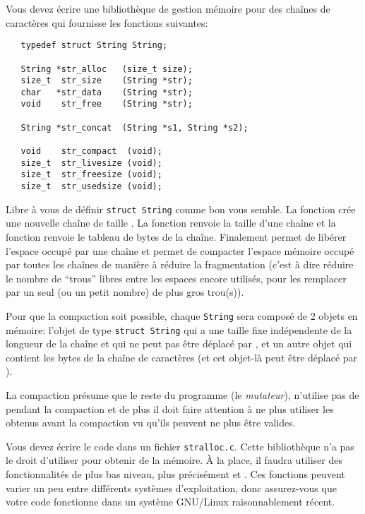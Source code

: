 \documentclass{article}
\begin{document}
Vous devez écrire une bibliothèque de gestion mémoire pour des
chaînes de caractères qui fournisse les fonctions suivantes:
\begin{verbatim}
   typedef struct String String;

   String *str_alloc   (size_t size);
   size_t  str_size    (String *str);
   char   *str_data    (String *str);
   void    str_free    (String *str);

   String *str_concat  (String *s1, String *s2);

   void    str_compact  (void);
   size_t  str_livesize (void);
   size_t  str_freesize (void);
   size_t  str_usedsize (void);
\end{verbatim}
Libre à vous de définir \texttt{struct String} comme bon vous semble.
La fonction  crée une nouvelle chaîne de taille .
La fonction  renvoie la taille d'une chaîne et la fonction
 renvoie le tableau de bytes de la chaîne.
Finalement  permet de libérer l'espace occupé par une chaîne
et  permet de compacter l'espace mémoire occupé par toutes
les chaînes de manière à réduire la fragmentation (c'est à dire réduire le
nombre de ``trous'' libres entre les espaces encore utilisés, pour les
remplacer par un seul (ou un petit nombre) de plus gros trou(s)).

Pour que la compaction soit possible, chaque \texttt{String} sera composé de
2 objets en mémoire: l'objet de type \texttt{struct String} qui a une taille
fixe indépendente de la longueur de la chaîne et qui ne peut pas être
déplacé par , et un autre objet qui contient les bytes de
la chaîne de caractères (et cet objet-là peut être déplacé par
).

La compaction présume que le reste du programme (le \emph{mutateur}),
n'utilise pas de  pendant la compaction et de plus il doit
faire attention à ne plus utiliser les  obtenus avant la
compaction vu qu'ils peuvent ne plus être valides.

Vous devez écrire le code dans un fichier \texttt{stralloc.c}.
Cette bibliothèque n'a pas le droit d'utiliser  pour obtenir de la
mémoire.  À la place, il faudra utiliser des fonctionnalités de plus bas
niveau, plus précisément  et .  Ces fonctions peuvent
varier un peu entre différents systèmes d'exploitation, donc assurez-vous
que votre code fonctionne dans un système GNU/Linux raisonnablement récent.
\end{document}
